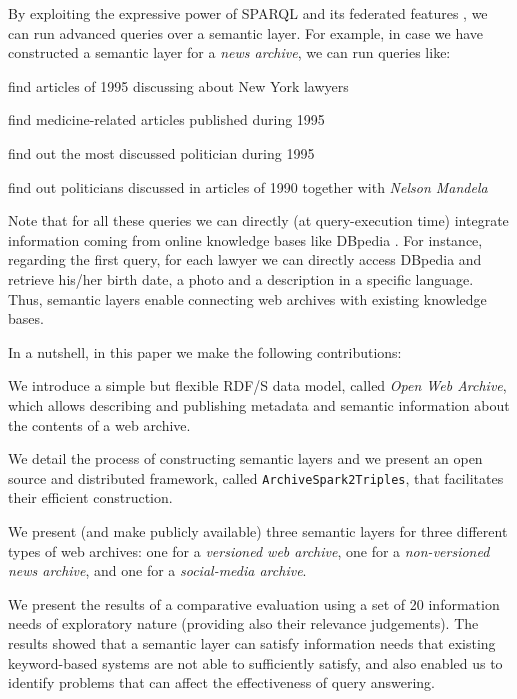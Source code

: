 \documentclass{libtex/sig-alternate-05-2015}
\newcommand{\tool}[0]{{\tt ArchiveSpark2Triples}}
\begin{document}
By exploiting the expressive power of SPARQL \cite{prud2008sparql}
and its federated features \cite{prud2013sparql},
we can run advanced queries over a semantic layer.
For example, in case we have constructed a semantic layer
for a {\em news archive}, we can run queries like:
\begin{compactitem}
\item find articles of 1995 discussing about New York lawyers
\item find medicine-related articles published during 1995
\item find out the most discussed politician during 1995
\item find out politicians discussed in articles of 1990 together with {\em Nelson Mandela}
\end{compactitem}
Note that for all these queries we can directly (at query-execution time)
integrate information coming from online knowledge bases like DBpedia \cite{lehmann2015dbpedia}.
For instance, regarding the first query, for each lawyer
we can directly access DBpedia and
retrieve his/her birth date,
a photo and a description in a specific language.
Thus, semantic layers enable connecting
web archives with existing knowledge bases.

In a nutshell, in this paper we make the following contributions:
\begin{compactitem}
\item   We introduce a simple but flexible RDF/S data model,
        called {\em Open Web Archive},
        which allows describing and publishing metadata and semantic information about
        the contents of a web archive.
\item   We detail the process
        of constructing semantic layers and
        we present an open source and distributed framework,
        called \tool, that
        facilitates their efficient construction.
\item   We present (and make publicly available)
        three semantic layers for three different types of web archives:
        one for a {\em  versioned web archive},
        one for a {\em non-versioned news archive},
        and one for a {\em social-media archive}.
\item   We present the results of a comparative evaluation using a set
        of 20 information needs of exploratory nature
        (providing also their relevance judgements).
        The results showed that a semantic layer can satisfy information
        needs that existing key\-word-based systems
        are not able to sufficiently satisfy, and also enabled
        us to identify problems that can affect the effectiveness of
        query answering.
\end{compactitem}
\end{document}
